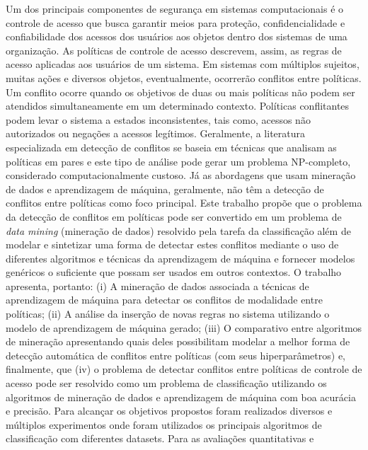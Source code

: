 \documentclass[
	12pt,				%
	openright,			%
	oneside,			%
	a4paper,			%
	english,			%
	french,				%
	spanish,			%
	brazil				%
	]{abntex2}
\begin{document}

\setlength{\absparsep}{18pt} %
\begin{resumo}
Um dos principais componentes de segurança em sistemas computacionais é o controle de acesso que busca garantir meios para proteção, confidencialidade e confiabilidade dos acessos dos usuários aos objetos dentro dos sistemas de uma organização. As políticas de controle de acesso descrevem, assim, as regras de acesso aplicadas aos usuários de um sistema. Em sistemas com múltiplos sujeitos, muitas ações e diversos objetos, eventualmente, ocorrerão conflitos entre políticas. Um conflito ocorre quando os objetivos de duas ou mais políticas não podem ser atendidos simultaneamente em um determinado contexto. Políticas conflitantes podem levar o sistema a estados inconsistentes, tais como, acessos não autorizados ou negações a acessos legítimos. Geralmente, a literatura especializada em detecção de conflitos se baseia em técnicas que analisam as políticas em pares e este tipo de análise pode gerar um problema NP-completo, considerado computacionalmente custoso. Já as abordagens que usam mineração de dados e aprendizagem de máquina, geralmente, não têm a detecção de conflitos entre políticas como foco principal. Este trabalho propõe que o problema da detecção de conflitos em políticas pode ser convertido em um problema de \textit{data mining} (mineração de dados) resolvido pela tarefa da classificação além de modelar e sintetizar uma forma de detectar estes conflitos mediante o uso de diferentes algoritmos e técnicas da aprendizagem de máquina e fornecer modelos genéricos o suficiente que possam ser usados em outros contextos. O trabalho apresenta, portanto: (i) A mineração de dados associada a técnicas de aprendizagem de máquina para detectar os conflitos de modalidade entre políticas; (ii) A análise da inserção de novas regras no sistema utilizando o modelo de aprendizagem de máquina gerado; (iii) O comparativo entre algoritmos de mineração apresentando quais deles possibilitam modelar a melhor forma de detecção automática de conflitos entre políticas (com seus hiperparâmetros) e, finalmente, que (iv) o problema de detectar conflitos  entre políticas de controle de acesso pode ser resolvido como um problema de classificação utilizando os algoritmos de mineração de dados e aprendizagem de máquina com boa acurácia e precisão. Para alcançar os objetivos propostos foram realizados diversos e múltiplos experimentos onde foram utilizados os principais algoritmos de classificação com diferentes datasets. Para as avaliações quantitativas e 
\end{resumo}
\end{document}
